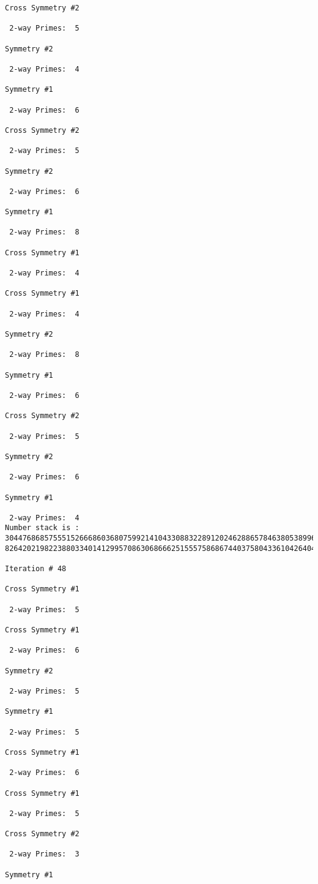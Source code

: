 {{{{\begin{verbatim}
Cross Symmetry #2

 2-way Primes: 	5

Symmetry #2

 2-way Primes: 	4

Symmetry #1

 2-way Primes: 	6

Cross Symmetry #2

 2-way Primes: 	5

Symmetry #2

 2-way Primes: 	6

Symmetry #1

 2-way Primes: 	8

Cross Symmetry #1

 2-way Primes: 	4

Cross Symmetry #1

 2-way Primes: 	4

Symmetry #2

 2-way Primes: 	8

Symmetry #1

 2-way Primes: 	6

Cross Symmetry #2

 2-way Primes: 	5

Symmetry #2

 2-way Primes: 	6

Symmetry #1

 2-way Primes: 	4
Number stack is :
30447686857555152666860368075992141043308832289120246288657846380538996794608835958544046240163340857
82642021982238803340141299570863068666251555758686744037580433610426404458595388064976998350836487568

Iteration #	48

Cross Symmetry #1

 2-way Primes: 	5

Cross Symmetry #1

 2-way Primes: 	6

Symmetry #2

 2-way Primes: 	5

Symmetry #1

 2-way Primes: 	5

Cross Symmetry #1

 2-way Primes: 	6

Cross Symmetry #1

 2-way Primes: 	5

Cross Symmetry #2

 2-way Primes: 	3

Symmetry #1


\end{verbatim}}}}}
